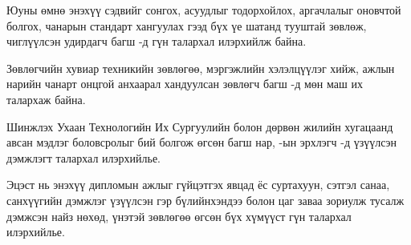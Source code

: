 
\begin{acknowledgements}
\addchaptertocentry{\acknowledgementname}

Юуны өмнө энэхүү  сэдвийг сонгох, асуудлыг тодорхойлох, аргачлалыг оновчтой болгох, чанарын стандарт хангуулах гээд бүх үе шатанд тууштай зөвлөж, чиглүүлсэн удирдагч багш \textbf{\supname}-д гүн талархал илэрхийлж байна.

Зөвлөгчийн хувиар техникийн зөвлөгөө, мэргэжлийн хэлэлцүүлэг хийж, ажлын нарийн чанарт онцгой анхаарал хандуулсан зөвлөгч багш \textbf{\advicename}-д мөн маш их талархаж байна.

Шинжлэх Ухаан Технологийн Их Сургуулийн \textbf{\facname} болон дөрвөн жилийн хугацаанд авсан мэдлэг боловсролыг бий болгож өгсөн багш нар, \textbf{\deptname}-ын эрхлэгч \textbf{\chairname}-д үзүүлсэн дэмжлэгт талархал илэрхийлье. 

Эцэст нь энэхүү дипломын ажлыг гүйцэтгэх явцад ёс суртахуун, сэтгэл санаа, санхүүгийн дэмжлэг үзүүлсэн гэр бүлийнхэндээ болон цаг заваа зориулж тусалж дэмжсэн найз нөхөд, үнэтэй зөвлөгөө өгсөн бүх хүмүүст гүн талархал илэрхийлье.

\end{acknowledgements}
